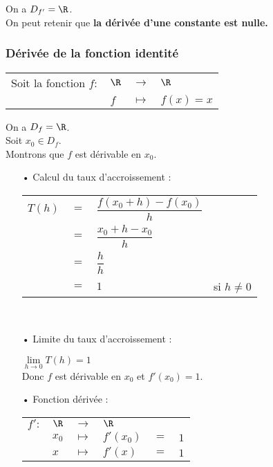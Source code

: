 \vspace*{.3cm}

On a $D_{f'} = \R$. \\

On peut retenir que \textbf{la dérivée d'une constante est nulle.}

\newpage

\subsubsection{Dérivée de la fonction identité}

\begin{tabular}{llll}
Soit la fonction $f :$ & $\R$ & $\longrightarrow$ & $\R$ \\
& $f$ & $\longmapsto$ & $f(x) = x$ \\
\end{tabular}

On a $D_f = \R$. \\

Soit $x_0 \in D_f$. \\

Montrons que $f$ est dérivable en $x_0$. \\

\begin{itemize}
\item[•] Calcul du taux d'accroissement : \vspace*{.3cm}
\\
\begin{tabular}{llll}
$T(h)$ & $=$ & $\dfrac{f(x_0 + h) - f(x_0)}{h}$ & \vspace*{.3cm} \\
& $=$ & $\dfrac{x_0 + h - x_0}{h}$ & \vspace*{.3cm} \\
& $=$ & $\dfrac{h}{h}$ & \vspace*{.3cm} \\
& $=$ & $1$ & si $h \neq 0$ \\
\end{tabular} \\
\vspace*{.3cm}

\item[•] Limite du taux d'accroissement : \vspace*{.3cm}

$\lim\limits_{h \to 0} T(h) = 1$ \\

Donc $f$ est dérivable en $x_0$ et $f'(x_0) = 1$. \\

\item[•] Fonction dérivée : \\

\begin{tabular}{llllll}
$f' :$ & $\R$ & $\longrightarrow$ & $\R$ & & \\
& $x_0$ & $\longmapsto$ & $f'(x_0)$ & $ = $ & $1$ \\
& $x$ & $\longmapsto$ & $f'(x)$ & $ = $ & $1$ \vspace*{.3cm} \\
\end{tabular}
\end{itemize}


